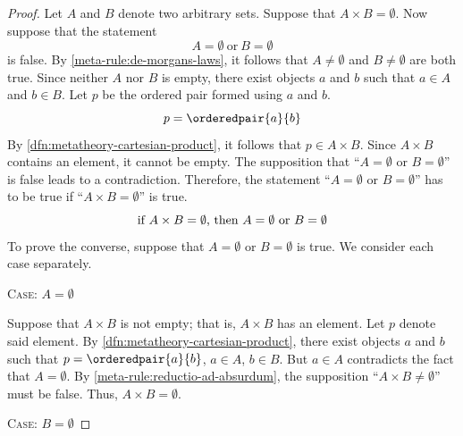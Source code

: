 \begin{proof}
    Let \( A \) and \( B \) denote two arbitrary sets.
    Suppose that \( A \times B = \emptyset \).
    Now suppose that the statement
    \begin{equation*}
        A = \emptyset \ \text{or} \ B = \emptyset
    \end{equation*}
    is false. By \cref{meta-rule:de-morgans-laws}, it follows that \( A \neq \emptyset \) and \( B \neq \emptyset \) are both true.
    Since neither \( A \) nor \( B \) is empty, there exist objects \( a \) and \( b \) such that \( a \in A \) and \( b \in B \).
    Let \( p \) be the ordered pair formed using \( a \) and \( b \).
    \begin{equation*}
        p = \orderedpair{a}{b}
    \end{equation*}
    By \cref{dfn:metatheory-cartesian-product}, it follows that \( p \in A \times B \).
    Since \( A \times B \) contains an element, it cannot be empty.
    The supposition that ``\( A = \emptyset \) or \( B = \emptyset \)'' is false leads to a contradiction.
    Therefore, the statement ``\( A = \emptyset \) or \( B = \emptyset \)'' has to be true if ``\( A \times B = \emptyset \)'' is true.
    \begin{equation}
        \label{eq:metatheory-empty-cartesian-product-implies-at-least-one-empty-set}
        \text{if \( A \times B = \emptyset \), then \( A = \emptyset \) or \( B = \emptyset \)}
    \end{equation}
    To prove the converse, suppose that \( A = \emptyset \) or \( B = \emptyset \) is true.
    We consider each case separately.

    \vspace{0.3cm}
    \noindent
    {\scshape Case:} \( A = \emptyset \)

    \vspace{0.1cm}
    \noindent
    Suppose that \( A \times B \) is not empty; that is, \( A \times B \) has an element.
    Let \( p \) denote said element.
    By \cref{dfn:metatheory-cartesian-product}, there exist objects \( a \) and \( b \) such that
    \( p = \orderedpair{a}{b} \), \( a \in A \), \( b \in B \).
    But \( a \in A \) contradicts the fact that \( A = \emptyset \).
    By \cref{meta-rule:reductio-ad-absurdum}, the supposition ``\( A \times B \neq \emptyset \)'' must be false.
    Thus, \( A \times B = \emptyset \).

    \vspace{0.3cm}
    \noindent
    {\scshape Case:} \( B = \emptyset \)


\end{proof}
